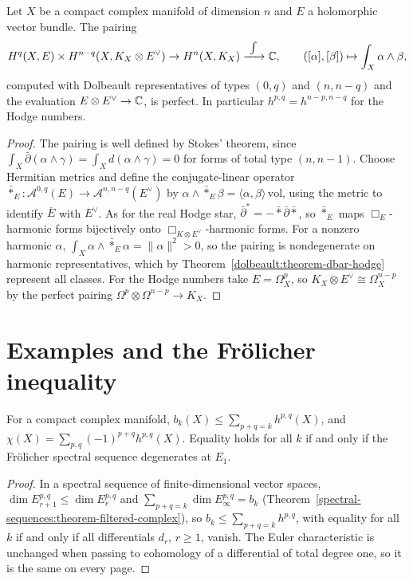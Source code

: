 \begin{theorem}\label{dolbeault:theorem-serre-duality}
Let $X$ be a compact complex manifold of dimension $n$ and $E$ a holomorphic vector bundle. The pairing
\[
H^q(X, E) \times H^{n-q}(X, K_X \otimes E^\vee) \to H^n(X, K_X) \xrightarrow{\ \int\ } \mathbb{C}, \qquad ([\alpha], [\beta]) \mapsto \int_X\alpha \wedge \beta,
\]
computed with Dolbeault representatives of types $(0,q)$ and $(n, n-q)$ and the evaluation $E \otimes E^\vee \to \mathbb{C}$, is perfect. In particular $h^{p,q} = h^{n-p,n-q}$ for the Hodge numbers.
\end{theorem}

\begin{proof}
The pairing is well defined by Stokes' theorem, since $\int_X\bar\partial(\alpha \wedge \gamma) = \int_Xd(\alpha \wedge \gamma) = 0$ for forms of total type $(n, n-1)$. Choose Hermitian metrics and define the conjugate-linear
operator $\bar*_E \colon \mathcal{A}^{0,q}(E) \to \mathcal{A}^{n,n-q}(E^\vee)$ by $\alpha \wedge \bar*_E\beta = \langle\alpha, \beta\rangle\,\mathrm{vol}$, using the metric to identify $\overline{E}$ with $E^\vee$. As
for the real Hodge star, $\bar\partial^* = -\bar*\bar\partial\bar*$, so $\bar*_E$ maps $\Box_E$-harmonic forms bijectively onto $\Box_{K \otimes E^\vee}$-harmonic forms. For a nonzero harmonic $\alpha$,
$\int_X\alpha \wedge \bar*_E\alpha = \|\alpha\|^2 > 0$, so the pairing is nondegenerate on harmonic representatives, which by Theorem~\ref{dolbeault:theorem-dbar-hodge} represent all classes. For the Hodge
numbers take $E = \Omega^p_X$, so $K_X \otimes E^\vee \cong \Omega^{n-p}_X$ by the perfect pairing $\Omega^p \otimes \Omega^{n-p} \to K_X$.
\end{proof}

\section{Examples and the Fr\"olicher inequality}\label{dolbeault:section-examples}

\begin{proposition}\label{dolbeault:proposition-frolicher-inequality}
For a compact complex manifold, $b_k(X) \leq \sum_{p+q=k}h^{p,q}(X)$, and $\chi(X) = \sum_{p,q}(-1)^{p+q}h^{p,q}(X)$. Equality holds for all $k$ if and only if the Fr\"olicher spectral sequence degenerates at
$E_1$.
\end{proposition}

\begin{proof}
In a spectral sequence of finite-dimensional vector spaces, $\dim E_{r+1}^{p,q} \leq \dim E_r^{p,q}$ and $\sum_{p+q=k}\dim E_\infty^{p,q} = b_k$ (Theorem~\ref{spectral-sequences:theorem-filtered-complex}), so
$b_k \leq \sum_{p+q=k}h^{p,q}$, with equality for all $k$ if and only if all differentials $d_r$, $r \geq 1$, vanish. The Euler characteristic is unchanged when passing to cohomology of a differential of
total degree one, so it is the same on every page.
\end{proof}

